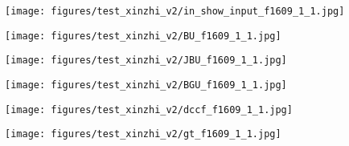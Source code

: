 \documentclass[runningheads]{llncs}
\begin{document}
\begin{figure*}[!thb]
        
        \begin{subfigure}[t]{0.15\linewidth}
            \centering
            \texttt{[image: figures/test\_xinzhi\_v2/in\_show\_input\_f1609\_1\_1.jpg]}
        \end{subfigure}
        \begin{subfigure}[t]{0.15\linewidth}
            \centering
            \texttt{[image: figures/test\_xinzhi\_v2/BU\_f1609\_1\_1.jpg]}
        \end{subfigure}
        \begin{subfigure}[t]{0.15\linewidth}
            \centering
            \texttt{[image: figures/test\_xinzhi\_v2/JBU\_f1609\_1\_1.jpg]}
        \end{subfigure}
        \begin{subfigure}[t]{0.15\linewidth}
            \centering
            \texttt{[image: figures/test\_xinzhi\_v2/BGU\_f1609\_1\_1.jpg]}
        \end{subfigure}
        \begin{subfigure}[t]{0.15\linewidth}
            \centering
            \texttt{[image: figures/test\_xinzhi\_v2/dccf\_f1609\_1\_1.jpg]}
        \end{subfigure}
        \begin{subfigure}[t]{0.15\linewidth}
            \centering
            \texttt{[image: figures/test\_xinzhi\_v2/gt\_f1609\_1\_1.jpg]}
        \end{subfigure}   
  



\end{figure*}
\end{document}
